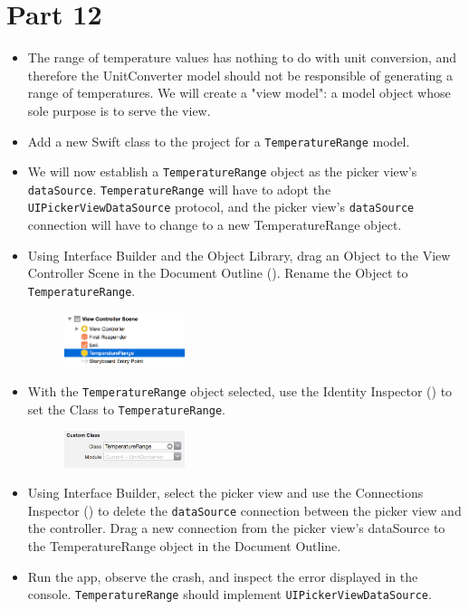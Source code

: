 \documentclass[a4paper,11pt]{scrartcl}
\begin{document}
\section*{Part 12}

\begin{itemize}
\item The range of temperature values has nothing to do with unit conversion, and therefore the UnitConverter model should not be responsible of generating a range of temperatures. We will create a "view model": a model object whose sole purpose is to serve the view.
\item Add a new Swift class to the project for a \texttt{TemperatureRange} model.
\item We will now establish a \texttt{TemperatureRange} object as the picker view's \texttt{dataSource}. \texttt{TemperatureRange} will have to adopt the \texttt{UIPickerViewDataSource} protocol, and the picker view's \texttt{dataSource} connection will have to change to a new TemperatureRange object.
\item Using Interface Builder and the Object Library, drag an Object to the View Controller Scene in the Document Outline (). Rename the Object to \texttt{TemperatureRange}.
\begin{figure}[h]
	\begin{center}
   \includegraphics[width=100pt]{temperaturerange.png}
	\end{center}
\end{figure}
\item With the \texttt{TemperatureRange} object selected, use the Identity Inspector () to set the Class to \texttt{TemperatureRange}.
\begin{figure}[h]
	\begin{center}
   \includegraphics[width=100pt]{identityinspector.png}
	\end{center}
\end{figure}
\item Using Interface Builder, select the picker view and use the Connections Inspector () to delete the \texttt{dataSource} connection between the picker view and the controller. Drag a new connection from the picker view's dataSource to the TemperatureRange object in the Document Outline.
\item Run the app, observe the crash, and inspect the error displayed in the console. \texttt{TemperatureRange} should implement \texttt{UIPickerViewDataSource}.
\end{itemize}
\end{document}
